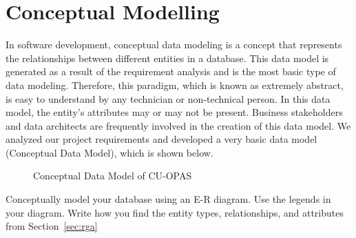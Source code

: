 \section{Conceptual Modelling}\label{sec:cm}
In software development, conceptual data modeling is a concept that represents the relationships between different entities in a database. This data model is generated as a result of the requirement analysis and is the most basic type of data modeling. Therefore, this paradigm, which is known as extremely abstract, is easy to understand by any technician or non-technical person. In this data model, the entity's attributes may or may not be present. Business stakeholders and data architects are frequently involved in the creation of this data model. 
We analyzed our project requirements and developed a very basic data model (Conceptual Data Model), which is shown below.
\begin{figure}[H]
	\captionsetup[subfigure]{labelformat=empty}
	\hfill
	\hfill
	\hfill
	\caption{Conceptual Data Model of CU-OPAS}
\end{figure}
Conceptually model your database using an E-R diagram. Use the legends in your diagram. Write how you find the entity types, relationships, and attributes from Section~\ref{sec:rga}